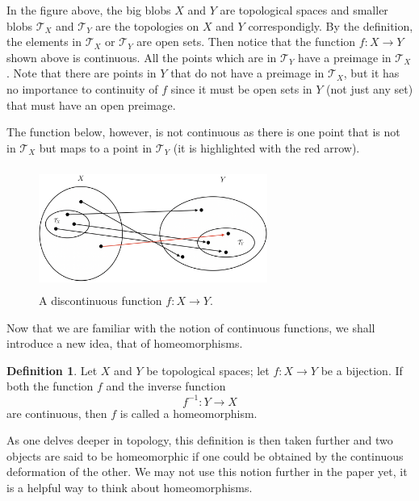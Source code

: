 \documentclass[12pt]{article}
\newcommand{\topology}{\mathcal{T}}              %
\theoremstyle{definition}
\newtheorem*{definition}{Definition}
\begin{document}
In the figure above, the big blobs $X$ and $Y$ are topological spaces and smaller blobs $\topology_X$
and $\topology_Y$ are the topologies on $X$ and $Y$ correspondigly. By the definition, the elements in $\topology_X$
or $\topology_Y$ are open sets. Then notice that the function $f : X \to Y$ shown above is continuous. All the points
which are in $\topology_Y$ have a preimage in $\topology_X$. Note that there are points in $Y$ that do not have a preimage
in $\topology_X$, but it has no importance to continuity of $f$ since it must be open sets in $Y$ (not just any set) that must
have an open preimage.

\bigskip

The function below, however, is not continuous as there is one point that is not in $\topology_X$
but maps to a point in $\topology_Y$ (it is highlighted with the red arrow).

\begin{figure}[H]
    \centering
    \includegraphics[width=7.5cm, height=4cm]{discontinuous-function}
    \caption*{A discontinuous function $f : X \to Y$.}
\end{figure}

\bigskip

Now that we are familiar with the notion of continuous functions, we shall introduce a new idea, that of homeomorphisms.

\begin{definition}
\cite{7} Let $X$ and $Y$ be topological spaces; let $f : X \to Y$ be a bijection. If both the function $f$
and the inverse function
$$f^{-1} : Y \to X$$
are continuous, then $f$ is called a homeomorphism.
\end{definition}

As one delves deeper in topology, this definition is then taken further and two objects are said to be homeomorphic if
one could be obtained by the continuous deformation of the other. We may not use this notion further in the paper yet,
it is a helpful way to think about homeomorphisms.

\end{document}
